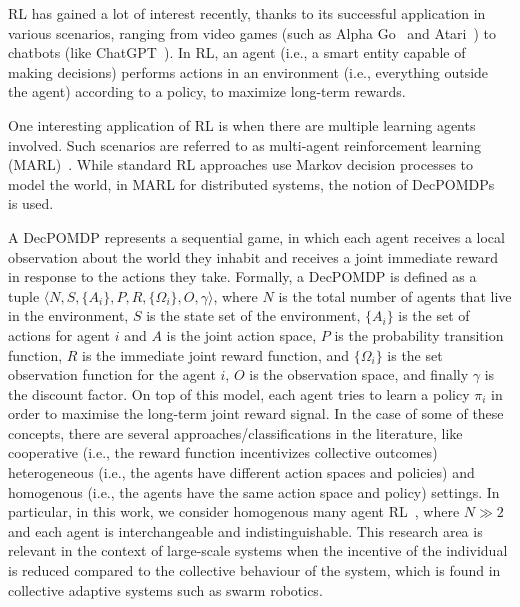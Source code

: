 \documentclass[conference]{IEEEtran}
\begin{document}
\Ac{RL} has gained a lot of interest recently, 
 thanks to its successful application in various scenarios, 
 ranging from video games (such as Alpha Go~\cite{Silver2016Go} and Atari~\cite{Atari2016DQN}) 
 to chatbots (like ChatGPT~\cite{ChatGPT2023}). 
% 
In \ac{RL}, an agent (i.e., a smart entity capable of making decisions) 
 performs actions in an environment (i.e., everything outside the agent) according to a policy, 
 to maximize long-term rewards.

One interesting application of \ac{RL} is when there are multiple learning agents involved. 
 Such scenarios are referred to as multi-agent reinforcement learning (MARL)~\cite{zhang2019marl}. 
 While standard \ac{RL} approaches use Markov decision processes to model the world, 
 in MARL for distributed systems, the notion of 
 \acp{DecPOMDP}~\cite{Decpomdp2000} is used.

A \ac{DecPOMDP} represents a sequential game, 
 in which each agent receives a local observation about the world they 
 inhabit and receives a joint immediate reward in response to the actions they take. 
% 
Formally, a \ac{DecPOMDP} is defined as a tuple $\langle N, S, \{A_i\}, P, R, \{\Omega_i\}, O, \gamma \rangle$, 
 where $N$ is the total number of agents that live in the environment, 
 $S$ is the state set of the environment, 
 $\{A_i\}$ is the set of actions for agent $i$ and $A$ is the joint action space, 
 $P$ is the probability transition function, 
 $R$ is the immediate joint reward function, and 
 $\{\Omega_i\}$ is the set observation function for the agent $i$,
 $O$ is the observation space, and finally $\gamma$ is the discount factor.
%
On top of this model, each agent tries to learn a policy $\pi_i$ in order 
 to maximise the long-term joint reward signal.
In the case of some of these concepts, 
 there are several approaches/classifications in the literature, 
 like cooperative (i.e., the reward function incentivizes collective outcomes)
 heterogeneous (i.e., the agents have different action spaces and policies) and
 homogenous (i.e., the agents have the same action space and policy) settings.
%  
In particular, in this work, we consider homogenous many agent RL~\cite{yang2021many}, 
 where $N \gg 2$ and each agent is interchangeable and indistinguishable.
%
This research area is relevant in the context of large-scale systems 
 when the incentive of the individual is reduced compared to the collective behaviour of the system, 
 which is found in collective adaptive systems such as swarm robotics.
\end{document}
